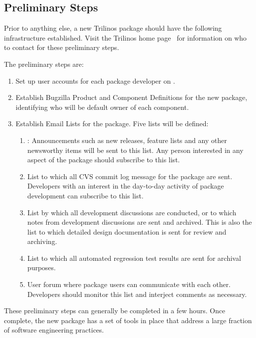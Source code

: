 \documentclass[12pt,relax]{TrilinosDevGuide}
\begin{document}
\subsection{Preliminary Steps}

Prior to anything else, a new Trilinos package should have the
following infrastructure established.  Visit the Trilinos home
page~\cite{Trilinos-home-page} for information on who to contact for
these preliminary steps.

The preliminary steps are:
\begin{enumerate}
\item Set up user accounts for each package developer 
on .
\item Establish Bugzilla Product and Component Definitions for the new
package, identifying who will be default owner of each component.
\item Establish Email Lists for the package.  Five lists will be
defined:
\begin{enumerate}
\item {}: 
Announcements such as 
new releases, feature lists and any other newsworthy items will be
sent to this list.  Any person interested in any aspect of the package
should subscribe to this list.
\item {} List
to which all CVS commit log message for the package are sent.
Developers with an interest in the day-to-day activity of package
development can subscribe to this list.
\item {}
List by which all development discussions are conducted, or to which
notes from development discussions are sent and archived.  This is
also the list to which detailed design documentation is sent for
review and archiving.
\item {} List
to which all automated regression test results are sent for archival purposes.
\item {} User
forum where package users can communicate with each other.  Developers
should monitor this list and interject comments as necessary.
\end{enumerate}
\end{enumerate}
These preliminary steps can generally be completed in a few hours.
Once complete, the new package has a set of tools in place that
address a large fraction of software engineering practices.
\end{document}
